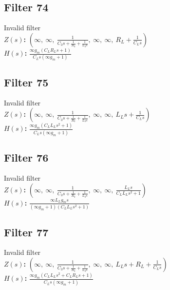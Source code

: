 \documentclass{article}
\begin{document}
\subsection*{Filter 74}
Invalid filter \\ 
\textbf{$Z(s)$:} $\left( \infty, \  \infty, \  \frac{1}{C_{3} s + \frac{1}{R_{3}} + \frac{1}{L_{3} s}}, \  \infty, \  \infty, \  R_{L} + \frac{1}{C_{L} s}\right)$ \\ 
\textbf{$H(s)$:} $\frac{\infty g_{m} \left(C_{L} R_{L} s + 1\right)}{C_{L} s \left(\infty g_{m} + 1\right)}$ \\ 
\subsection*{Filter 75}
Invalid filter \\ 
\textbf{$Z(s)$:} $\left( \infty, \  \infty, \  \frac{1}{C_{3} s + \frac{1}{R_{3}} + \frac{1}{L_{3} s}}, \  \infty, \  \infty, \  L_{L} s + \frac{1}{C_{L} s}\right)$ \\ 
\textbf{$H(s)$:} $\frac{\infty g_{m} \left(C_{L} L_{L} s^{2} + 1\right)}{C_{L} s \left(\infty g_{m} + 1\right)}$ \\ 
\subsection*{Filter 76}
Invalid filter \\ 
\textbf{$Z(s)$:} $\left( \infty, \  \infty, \  \frac{1}{C_{3} s + \frac{1}{R_{3}} + \frac{1}{L_{3} s}}, \  \infty, \  \infty, \  \frac{L_{L} s}{C_{L} L_{L} s^{2} + 1}\right)$ \\ 
\textbf{$H(s)$:} $\frac{\infty L_{L} g_{m} s}{\left(\infty g_{m} + 1\right) \left(C_{L} L_{L} s^{2} + 1\right)}$ \\ 
\subsection*{Filter 77}
Invalid filter \\ 
\textbf{$Z(s)$:} $\left( \infty, \  \infty, \  \frac{1}{C_{3} s + \frac{1}{R_{3}} + \frac{1}{L_{3} s}}, \  \infty, \  \infty, \  L_{L} s + R_{L} + \frac{1}{C_{L} s}\right)$ \\ 
\textbf{$H(s)$:} $\frac{\infty g_{m} \left(C_{L} L_{L} s^{2} + C_{L} R_{L} s + 1\right)}{C_{L} s \left(\infty g_{m} + 1\right)}$ \\ 
\end{document}
